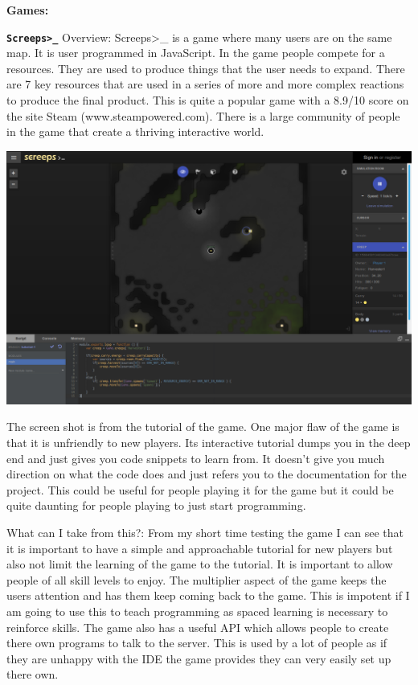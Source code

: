 \documentclass[12pt]{article}
\begin{document}
\textbf{Games:}

\texttt{\textbf{Screeps>\_}}\newline
Overview:\newline
Screeps>\_ is a game where many users are on the same map. It is user programmed in JavaScript. In the game people compete for a resources. They are used to produce things that the user needs to expand. There are 7 key resources that are used in a series of more and more complex reactions to produce the final product. This is quite a popular game with a 8.9/10 score on the site Steam (www.steampowered.com). There is a large community of people in the game that create a thriving interactive world.

{\centering
\includegraphics[width=15cm]{Images/screeps.png}\par
}

The screen shot is from the tutorial of the game. One major flaw of the game is that it is unfriendly to new players. Its interactive tutorial dumps you in the deep end and just gives you code snippets to learn from. It doesn't give you much direction on what the code does and just refers you to the documentation for the project. This could be useful for people playing it for the game but it could be quite daunting for people playing to just start programming.


What can I take from this?:\newline
From my short time testing the game I can see that it is important to have a simple and approachable tutorial for new players but also not limit the learning of the game to the tutorial. It is important to allow people of all skill levels to enjoy. 
The multiplier aspect of the game keeps the users attention and has them keep coming back to the game. This is impotent if I am going to use this to teach programming as spaced learning is necessary to reinforce skills.
The game also has a useful API which allows people to create there own programs to talk to the server. This is used by a lot of people as if they are unhappy with the IDE the game provides they can very easily set up there own.
\end{document}
